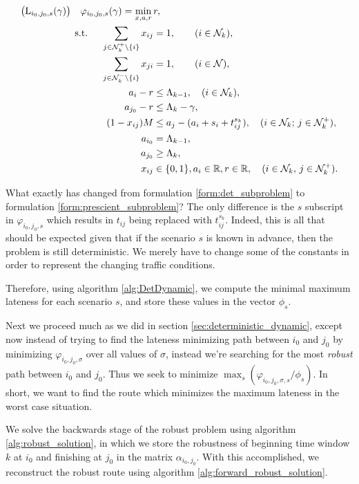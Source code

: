 \begin{align}
\label{form:prescient_subproblem}
\begin{split}
\bigl(\operatorname{L}_{i_0,j_0, s}(\gamma)\bigr)\quad
\varphi_{i_0,j_0, s}(\gamma)=\min_{x,a,r}\,&r,\\
\text{s.t. }\quad \sum_{j\in{\mathcal N}_{k}^+\setminus\{i\}} x_{ij}&=1,\qquad (i\in{\mathcal N}_k),\\
\sum_{j\in{\mathcal N}_{k}^-\setminus\{i\}} x_{ji}&=1,\qquad(i\in{\mathcal N}),\\
a_i-r&\leq \Lambda_{k-1},\quad(i\in{\mathcal N}_k),\\
a_{j_0} -r& \leq \Lambda_k - \gamma, \\
(1-x_{ij})M&\leq a_j - (a_i+s_i+t^{s_k}_{ij}),\quad(i\in{\mathcal N}_k;\,j\in{\mathcal N}_k^+),\\
a_{i_0}&=\Lambda_{k-1},\\
a_{j_0}&\geq \Lambda_{k},\\
x_{ij}&\in\{0,1\},  a_i\in\mathbb{R}, r\in\mathbb{R},\quad(i\in{\mathcal N}_k,\,j\in{\mathcal N}_k^+).
\end{split}
\end{align}

What exactly has changed from formulation \ref{form:det_subproblem} to formulation \ref{form:prescient_subproblem}? The only difference is the $s$ subscript in $\varphi_{i_0, j_0, s}$ which results in $t_{ij}$ being replaced with $t^{s_k}_{ij}$. Indeed, this is all that should be expected given that if the scenario $s$ is known in advance, then the problem is still deterministic. We merely have to change some of the constants in order to represent the changing traffic conditions.

Therefore, using algorithm \ref{alg:DetDynamic}, we compute the minimal maximum lateness for each scenario $s$, and store these values in the vector $\phi_s$. 

Next we proceed much as we did in section \ref{sec:deterministic_dynamic}, except now instead of trying to find the lateness minimizing path between $i_0$ and $j_0$ by minimizing $\varphi_{i_0, j_0, \sigma}$ over all values of $\sigma$, instead we're searching for the most \textit{robust} path between $i_0$ and $j_0$. Thus we seek to minimize $\max_s (\varphi_{i_0, j_0, \sigma, s}/\phi_s)$. In short, we want to find the route which minimizes the maximum lateness in the worst case situation. 

We solve the backwards stage of the robust problem using algorithm \ref{alg:robust_solution}, in which we store the robustness of beginning time window $k$ at $i_0$ and finishing at $j_0$ in the matrix $\alpha_{i_0, j_0}$. With this accomplished, we reconstruct the robust route using algorithm 
\ref{alg:forward_robust_solution}.

